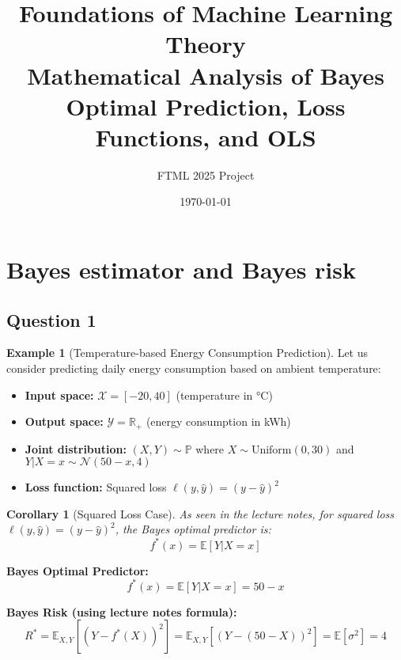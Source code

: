 \documentclass[11pt,a4paper]{article}
\title{\textbf{Foundations of Machine Learning Theory}\\
\large Mathematical Analysis of Bayes Optimal Prediction, Loss Functions, and OLS}
\author{FTML 2025 Project}
\date{\today}
\newtheorem{corollary}[theorem]{Corollary}
\theoremstyle{definition}
\newtheorem{example}[theorem]{Example}
\theoremstyle{remark}
\begin{document}
\section{Bayes estimator and Bayes risk}
\subsection{Question 1}

\begin{example}[Temperature-based Energy Consumption Prediction]
Let us consider predicting daily energy consumption based on ambient temperature:
\begin{itemize}
    \item \textbf{Input space:} $\mathcal{X} = [-20, 40]$ (temperature in °C)
    \item \textbf{Output space:} $\mathcal{Y} = \mathbb{R}_+$ (energy consumption in kWh)
    \item \textbf{Joint distribution:} $(X, Y) \sim \mathbb{P}$ where $X \sim \text{Uniform}(0, 30)$ and $Y|X = x \sim \mathcal{N}(50 - x, 4)$
    \item \textbf{Loss function:} Squared loss $\ell(y, \hat{y}) = (y - \hat{y})^2$
\end{itemize}

\begin{corollary}[Squared Loss Case]
As seen in the lecture notes, for squared loss $\ell(y, \hat{y}) = (y - \hat{y})^2$, the Bayes optimal predictor is:
\[f^*(x) = \mathbb{E}[Y|X = x]\]
\end{corollary}

\textbf{Bayes Optimal Predictor:}
\[f^*(x) = \mathbb{E}[Y|X = x] = 50 - x\]


\textbf{Bayes Risk (using lecture notes formula):}
\[R^* = \mathbb{E}_{X,Y}[(Y - f^*(X))^2] = \mathbb{E}_{X,Y}[(Y - (50 - X))^2] = \mathbb{E}[\sigma^2] = 4\]
\end{example}
\end{document}
